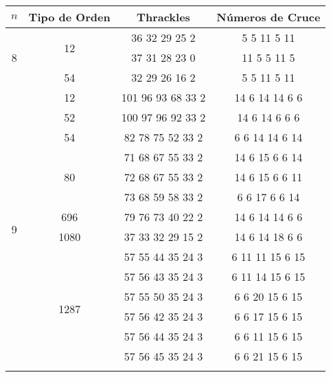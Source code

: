 \label{apendice_thrackles_inducen_cn}
  \begin{tabular}[t]{|c|c|c|c|}
    \hline
    $n$                 & Tipo de Orden       & Thrackles             & Números de Cruce\\ \hline \hline
    \multirow{3}{*}{8}  & \multirow{2}{*}{12} & 36 32 29 25 2         & 5 5 11 5 11     \\ \cline{4-4}
                        &                     & 37 31 28 23 0         & 11 5 5 11 5     \\ \cline{2-4}
                        & 54                  & 32 29 26 16 2         & 5 5 11 5 11     \\ \hline
    \multirow{23}{*}{9} & 12                  & 101 96 93 68 33 2     & 14 6 14 14 6 6  \\ \cline{2-4}
                        & 52                  & 100 97 96 92 33 2     & 14 6 14 6 6 6   \\ \cline{2-4}
                        & 54                  & 82 78 75 52 33 2      & 6 6 14 14 6 14  \\ \cline{2-4}
                        & \multirow{3}{*}{80} & 71 68 67 55 33 2      & 14 6 15 6 6 14  \\ \cline{4-4}
                        &                     & 72 68 67 55 33 2      & 14 6 15 6 6 11  \\ \cline{4-4}
                        &                     & 73 68 59 58 33 2      & 6 6 17 6 6 14   \\ \cline{4-4}
                        & 696                 & 79 76 73 40 22 2      & 14 6 14 14 6 6  \\ \cline{2-4}
                        & 1080                & 37 33 32 29 15 2      & 14 6 14 18 6 6  \\ \cline{2-4}
                        &\multirow{15}{*}{1287}& 57 55 44 35 24 3     & 6 11 11 15 6 15 \\ \cline{4-4}
                        &                     & 57 56 43 35 24 3      & 6 11 14 15 6 15 \\ \cline{4-4}
                        &                     & 57 55 50 35 24 3      & 6 6 20 15 6 15  \\ \cline{4-4}
                        &                     & 57 56 42 35 24 3      & 6 6 17 15 6 15  \\ \cline{4-4}
                        &                     & 57 56 44 35 24 3      & 6 6 11 15 6 15  \\ \cline{4-4}
                        &                     & 57 56 45 35 24 3      & 6 6 21 15 6 15  \\ \cline{4-4}

\end{tabular}
